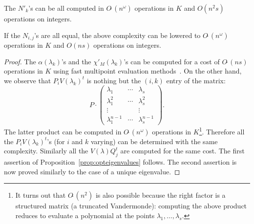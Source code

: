 \documentclass{sig-alternate-05-2015}
\newcommand{\softO}{O\tilde{~}}
\begin{document}
\begin{prop}
\label{prop:opteigenvalues}
The $N'_k$'s can be all computed in $\softO(n^\omega)$ operations
in $K$ and $O(n^2 s)$ operations on integers.

If the $N_{i,j}$'s are all equal, the above complexity can be 
lowered to $\softO(n^\omega)$ operations in $K$ and $O(n s)$ operations 
on integers.
\end{prop}

\begin{proof}
The $\alpha(\lambda_k)$'s and the $\chi'_M(\lambda_k)$'s can be computed 
for a cost of $\softO(ns)$ operations in $K$ using fast multipoint 
evaluation methods~\cite{}.
On the other hand, we observe that $P_i V(\lambda_k)^t$ is nothing but
the $(i,k)$ entry of the matrix:
$$P \cdot \left( \begin{matrix}
\lambda_1 & \cdots & \lambda_s \\
\lambda_1^2 & \cdots & \lambda_s^2 \\
\vdots & & \vdots \\
\lambda_1^{n-1} & \cdots & \lambda_s^{n-1}
\end{matrix} \right).$$
The latter product can be computed in $\softO(n^\omega)$ operations in 
$K$\footnote{It turns out that $\softO(n^2)$ is also possible because
the right factor is a structured matrix (a truncated Vandermonde):
computing the above product reduces to evaluate a polynomial at the
points $\lambda_1, \ldots, \lambda_s$.}. Therefore all the $P_i 
V(\lambda_k)^t$'s (for $i$ and $k$ varying) 
can be determined with the same complexity. 
Similarly all the $V(\lambda) Q_j^t$ are computed for the same cost.
The first assertion of Proposition~\ref{prop:opteigenvalues} follows.
The second assertion is now proved similarly to the case of a unique
eigenvalue.
\end{proof}




\end{document}
